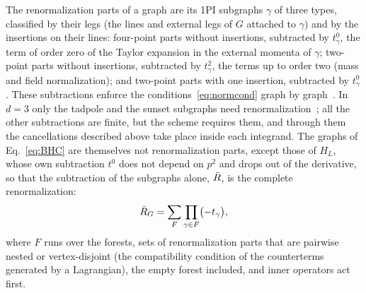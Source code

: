 The renormalization parts of a graph are its 1PI subgraphs $\gamma$ of three types, classified by their legs (the
lines and external legs of $G$ attached to $\gamma$) and by the insertions on their lines: four-point parts without
insertions, subtracted by $t^0_\gamma$, the term of order zero of the Taylor expansion in the external momenta of
$\gamma$; two-point parts without insertions, subtracted by $t^2_\gamma$, the terms up to order two (mass and field
normalization); and two-point parts with one insertion, subtracted by $t^0_\gamma$. These subtractions enforce the
conditions~\eqref{eq:normcond} graph by graph~\cite{BogoliubovParasiuk1957,Hepp1966,Zimmermann1969,BergereLam1976,Zavialov1990}. In $d=3$ only the tadpole and
the sunset subgraphs need renormalization~\cite{Ribeca2003thesis,Phi4tools2024}; all the other subtractions are finite, but the scheme requires them,
and through them the cancellations described above take place inside each integrand. The graphs of Eq.~\eqref{eq:BHC}
are themselves not renormalization parts, except those of $H_L$, whose own subtraction $t^0$ does not depend on $p^2$
and drops out of the derivative, so that the subtraction of the subgraphs alone, $\bar R$, is the complete
renormalization:
\begin{equation}
\bar R_G=\sum_{F}\prod_{\gamma\in F}\bigl(-t_\gamma\bigr),
\label{eq:forest}
\end{equation}
where $F$ runs over the forests, sets of renormalization parts that are pairwise nested or vertex-disjoint (the
compatibility condition of the counterterms generated by a Lagrangian), the empty forest included, and inner operators
act first.

